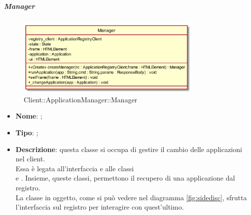 \hypertarget{Manager_label}{\subparagraph{Manager}}
\begin{figure}[h]
	\centering
	\includegraphics[width=0.80\textwidth,height=\textheight,keepaspectratio]{images/ClassManager.png}
	\caption{Client::ApplicationManager::Manager}
\end{figure}
\begin{itemize}
	\item \textbf{Nome}: ;
	\item \textbf{Tipo}: ;
	\item \textbf{Descrizione}: questa classe si occupa di gestire il cambio delle applicazioni nel client.\\
Essa è legata all'interfaccia  e alle classi \\  e . Insieme, queste classi, permettono il recupero di una applicazione dal registro. \\
La classe in oggetto, come si può vedere nel diagramma \ref{fig:sidedisc}, sfrutta l'interfaccia sul registro per interagire con quest'ultimo.


\end{itemize}
